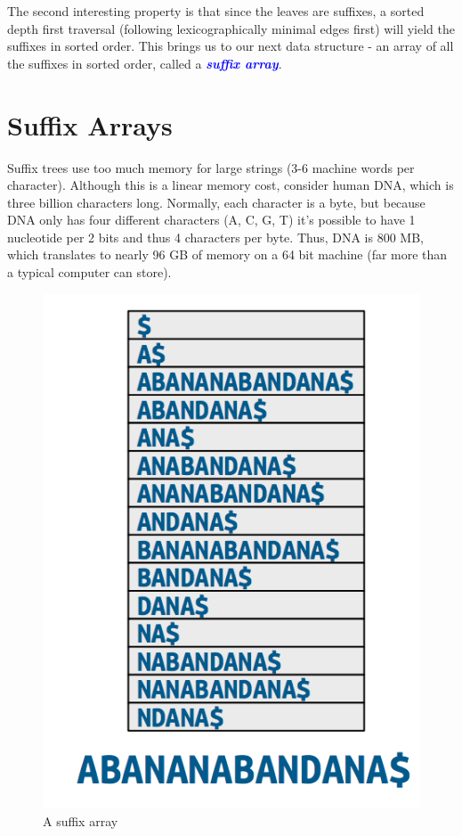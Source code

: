 \documentclass[11pt, oneside]{article}
\newcommand{\emphasis}[1]{\textcolor{blue}{\textbf{\textit{#1}}}}
\begin{document}
The second interesting property is that since the leaves are suffixes, a sorted depth first traversal
(following lexicographically minimal edges first) will yield the suffixes in sorted order.
This brings us to our next data structure - an array of all the suffixes in sorted order, called a \emphasis{suffix array}.

\section{Suffix Arrays}

Suffix trees use too much memory for large strings (3-6 machine words per character).
Although this is a linear memory cost, consider human DNA, which is three billion characters long.
Normally, each character is a byte, but because DNA only has four different characters (A, C, G, T)
it's possible to have 1 nucleotide per 2 bits and thus 4 characters per byte.
Thus, DNA is 800 MB, which translates to nearly 96 GB of memory on a 64 bit machine
(far more than a typical computer can store).

\begin{figure}[h!]
\centering
\includegraphics[scale=0.25]{array}
\caption{A suffix array}
\end{figure}
\end{document}
